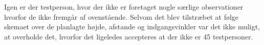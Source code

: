 %
Igen er der testperson, hvor der ikke er foretaget nogle særlige observationer hvorfor de ikke fremgår af ovenstående. Selvom det blev tilstræbet at følge skemaet over de planlagte højde, afstande og indgangsvinkler var det ikke muligt, at overholde det, hvorfor det ligeledes accepteres at der ikke er 45 testpersoner.  
\newpage
